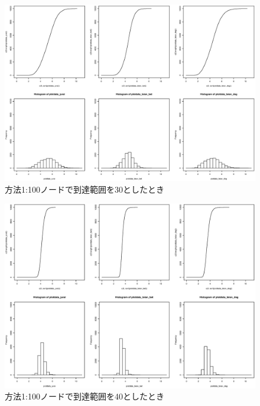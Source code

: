 \begin{landscape}
\begin{figure}[H]
  \centering
  \includegraphics[width=1.2\textwidth]{figures/1_100_30.eps}
  \caption{方法1:100ノードで到達範囲を30としたとき}
  \label{fig:plot}
\end{figure}

\begin{figure}[H]
  \centering
  \includegraphics[width=1.2\textwidth]{figures/1_100_40.eps}
  \caption{方法1:100ノードで到達範囲を40としたとき}
  \label{fig:plot}
\end{figure}


\end{landscape}
